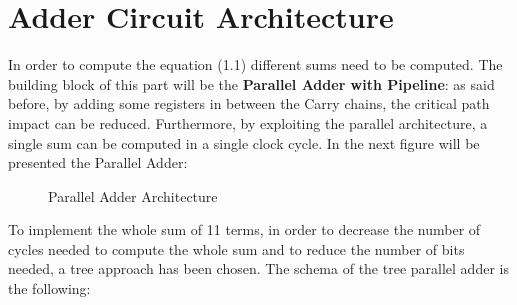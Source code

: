 \section{Adder Circuit Architecture}
In order to compute the equation (1.1) different sums need to be computed. The building block of this part will be the \textbf{Parallel Adder with Pipeline}: as said before, by adding some registers in between the Carry chains, the critical path impact can be reduced. Furthermore, by exploiting the parallel architecture, a single sum can be computed in a single clock cycle. In the next figure will be presented the Parallel Adder:
 \begin{figure}[H]
 	\centering
 	\caption{Parallel Adder Architecture}
 \end{figure}
To implement the whole sum of 11 terms, in order to decrease the number of cycles needed to compute the whole sum and to reduce the number of bits needed, a tree approach has been chosen. The schema of the tree parallel adder is the following:
